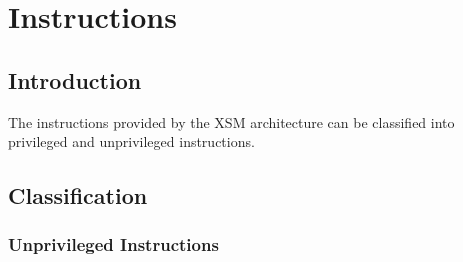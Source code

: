 \documentclass[11pt]{article}
\begin{document}
\section{Instructions}

\subsection{Introduction}
The instructions provided by the XSM architecture can be classified into privileged and unprivileged instructions.

\subsection{Classification}

\subsubsection{Unprivileged Instructions}
\end{document}
